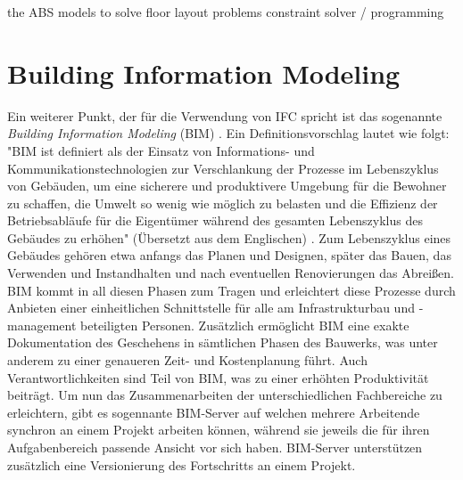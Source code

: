 the ABS models to solve floor layout problems
constraint solver / programming

\section{Building Information Modeling}
Ein weiterer Punkt, der für die Verwendung von IFC spricht ist das sogenannte \textit{Building Information Modeling} (BIM) \cite{Building41:online}.
Ein Definitionsvorschlag lautet wie folgt: "BIM ist definiert als der Einsatz von Informations- und Kommunikationstechnologien zur Verschlankung der Prozesse im Lebenszyklus von Gebäuden, um eine sicherere und produktivere Umgebung für die Bewohner zu schaffen, die Umwelt so wenig wie möglich zu belasten und die Effizienz der Betriebsabläufe für die Eigentümer während des gesamten Lebenszyklus des Gebäudes zu erhöhen" (Übersetzt aus dem Englischen) \cite{Microsof51:online}.
Zum Lebenszyklus eines Gebäudes gehören etwa anfangs das Planen und Designen, später das Bauen, das Verwenden und Instandhalten und nach eventuellen Renovierungen das Abreißen.
BIM kommt in all diesen Phasen zum Tragen und erleichtert diese Prozesse durch Anbieten einer einheitlichen Schnittstelle für alle am Infrastrukturbau und -management beteiligten Personen.
Zusätzlich ermöglicht BIM eine exakte Dokumentation des Geschehens in sämtlichen Phasen des Bauwerks, was unter anderem zu einer  genaueren Zeit- und Kostenplanung führt.
Auch Verantwortlichkeiten sind Teil von BIM, was zu einer erhöhten Produktivität beiträgt.
Um nun das Zusammenarbeiten der unterschiedlichen Fachbereiche zu erleichtern, gibt es sogennante BIM-Server auf welchen mehrere Arbeitende synchron an einem Projekt arbeiten können, während sie jeweils die für ihren Aufgabenbereich passende Ansicht vor sich haben.
BIM-Server unterstützen zusätzlich eine Versionierung des Fortschritts an einem Projekt.

